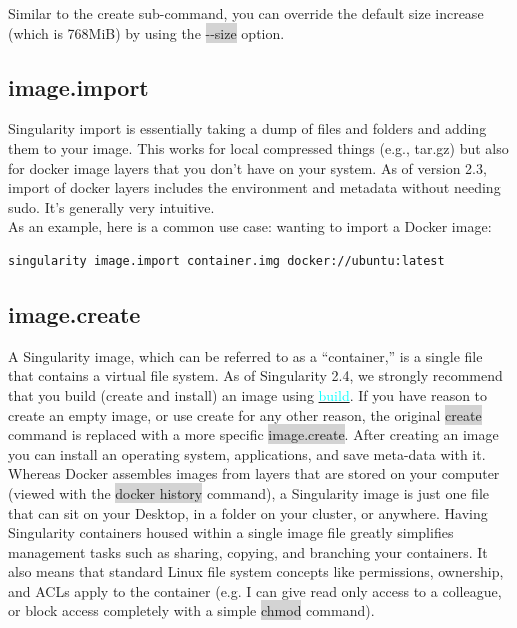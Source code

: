 \documentclass[a4paper]{article}
\begin{document}
Similar to the create sub-command, you can override the default size increase (which is 768MiB) by using the \colorbox{lightgray}{-{}-size} option.


\subsection{image.import}
\label{sec:imageimport}

Singularity import is essentially taking a dump of files and folders and adding them to your image. This works for local compressed things (e.g., tar.gz) but also for docker image layers that you don’t have on your system. As of version 2.3, import of docker layers includes the environment and metadata without needing sudo. It’s generally very intuitive.\\[0.1in]

As an example, here is a common use case: wanting to import a Docker image:\\

\begin{lstlisting}[frame=single]
singularity image.import container.img docker://ubuntu:latest
\end{lstlisting}

\subsection{image.create}
\label{sec:imagecreate}

A Singularity image, which can be referred to as a “container,” is a single file that contains a virtual file system. As of Singularity 2.4, we strongly recommend that you build (create and install) an image using \hyperref[sec:buildcontainer]{{\textcolor{cyan}{build}}}. If you have reason to create an empty image, or use create for any other reason, the original \colorbox{lightgray}{create} command is replaced with a more specific  \colorbox{lightgray}{image.create}. After creating an image you can install an operating system, applications, and save meta-data with it.\\[0.1in]

Whereas Docker assembles images from layers that are stored on your computer (viewed with the  \colorbox{lightgray}{docker history} command), a Singularity image is just one file that can sit on your Desktop, in a folder on your cluster, or anywhere. Having Singularity containers housed within a single image file greatly simplifies management tasks such as sharing, copying, and branching your containers. It also means that standard Linux file system concepts like permissions, ownership, and ACLs apply to the container (e.g. I can give read only access to a colleague, or block access completely with a simple  \colorbox{lightgray}{chmod} command).
\end{document}
